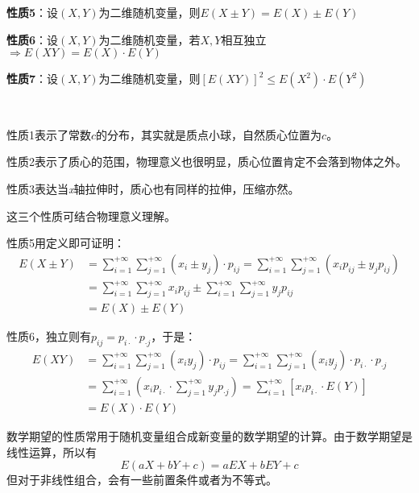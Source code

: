 {\bf 性质5}：设$\left( X,Y \right) $为二维随机变量，则$E\left( X\pm Y \right) =E\left( X \right) \pm E\left( Y \right) $

{\bf 性质6}：设$\left( X,Y \right) $为二维随机变量，若$X,Y$相互独立$\Rightarrow E\left( XY \right) =E\left( X \right) \cdot E\left( Y \right) $

{\bf 性质7}：设$\left( X,Y \right) $为二维随机变量，则$\left[ E\left( XY \right) \right] ^2\leqslant E\left( X^2 \right) \cdot E\left( Y^2 \right) $

~

性质1表示了常数$c$的分布，其实就是质点小球，自然质心位置为$c$。

性质2表示了质心的范围，物理意义也很明显，质心位置肯定不会落到物体之外。

性质3表达当{\it x}轴拉伸时，质心也有同样的拉伸，压缩亦然。

\begin{tcolorbox}
这三个性质可结合物理意义理解。
\end{tcolorbox}

性质5用定义即可证明：
\begin{align*}
E\left( X\pm Y \right) &=\sum_{i=1}^{+\infty}{\sum_{j=1}^{+\infty}{\left( x_i\pm y_j \right) \cdot p_{ij}}}=\sum_{i=1}^{+\infty}{\sum_{j=1}^{+\infty}{\left( x_ip_{ij}\pm y_jp_{ij} \right)}} \\
&=\sum_{i=1}^{+\infty}{\sum_{j=1}^{+\infty}{x_ip_{ij}}}\pm \sum_{i=1}^{+\infty}{\sum_{j=1}^{+\infty}{y_jp_{ij}}} \\
&=E\left( X \right) \pm E\left( Y \right)
\end{align*}

性质6，独立则有$p_{ij}=p_{i\cdot}\cdot p_{\cdot j}$，于是：
\begin{align*}
E\left( XY \right) &=\sum_{i=1}^{+\infty}{\sum_{j=1}^{+\infty}{\left( x_iy_j \right) \cdot p_{ij}}}=\sum_{i=1}^{+\infty}{\sum_{j=1}^{+\infty}{\left( x_iy_j \right) \cdot p_{i\cdot}\cdot p_{\cdot j}}} \\
&=\sum_{i=1}^{+\infty}{\left( x_ip_{i\cdot}\cdot \sum_{j=1}^{+\infty}{y_jp_{\cdot j}} \right)}=\sum_{i=1}^{+\infty}{\left[ x_ip_{i\cdot}\cdot E\left( Y \right) \right]} \\
&=E\left( X \right) \cdot E\left( Y \right)
\end{align*}

\begin{tcolorbox}
数学期望的性质常用于随机变量组合成新变量的数学期望的计算。由于数学期望是线性运算，所以有
\[
E\left( aX+bY+c \right) =aEX+bEY+c
\]
但对于非线性组合，会有一些前置条件或者为不等式。
\end{tcolorbox}

